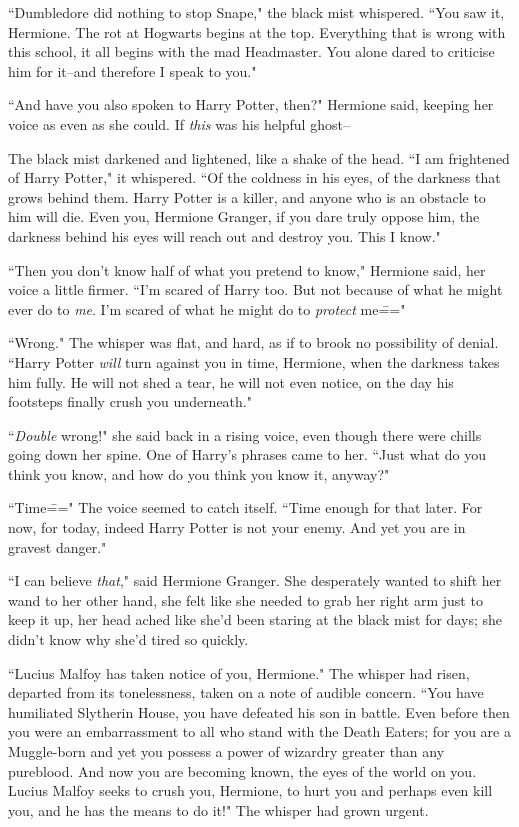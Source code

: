 ``Dumbledore did nothing to stop Snape," the black mist whispered. ``You saw it, Hermione. The rot at Hogwarts begins at the top. Everything that is wrong with this school, it all begins with the mad Headmaster. You alone dared to criticise him for it\---and therefore I speak to you."

``And have you also spoken to Harry Potter, then?" Hermione said, keeping her voice as even as she could. If \emph{this} was his helpful ghost\---

The black mist darkened and lightened, like a shake of the head. ``I am frightened of Harry Potter," it whispered. ``Of the coldness in his eyes, of the darkness that grows behind them. Harry Potter is a killer, and anyone who is an obstacle to him will die. Even you, Hermione Granger, if you dare truly oppose him, the darkness behind his eyes will reach out and destroy you. This I know."

``Then you don't know half of what you pretend to know," Hermione said, her voice a little firmer. ``I'm scared of Harry too. But not because of what he might ever do to \emph{me}. I'm scared of what he might do to \emph{protect} me\==="

``Wrong." The whisper was flat, and hard, as if to brook no possibility of denial. ``Harry Potter \emph{will} turn against you in time, Hermione, when the darkness takes him fully. He will not shed a tear, he will not even notice, on the day his footsteps finally crush you underneath."

``\emph{Double} wrong!" she said back in a rising voice, even though there were chills going down her spine. One of Harry's phrases came to her. ``Just what do you think you know, and how do you think you know it, anyway?"

``Time\===" The voice seemed to catch itself. ``Time enough for that later. For now, for today, indeed Harry Potter is not your enemy. And yet you are in gravest danger."

``I can believe \emph{that}," said Hermione Granger. She desperately wanted to shift her wand to her other hand, she felt like she needed to grab her right arm just to keep it up, her head ached like she'd been staring at the black mist for days; she didn't know why she'd tired so quickly.

``Lucius Malfoy has taken notice of you, Hermione." The whisper had risen, departed from its tonelessness, taken on a note of audible concern. ``You have humiliated Slytherin House, you have defeated his son in battle. Even before then you were an embarrassment to all who stand with the Death Eaters; for you are a Muggle-born and yet you possess a power of wizardry greater than any pureblood. And now you are becoming known, the eyes of the world on you. Lucius Malfoy seeks to crush you, Hermione, to hurt you and perhaps even kill you, and he has the means to do it!" The whisper had grown urgent.

